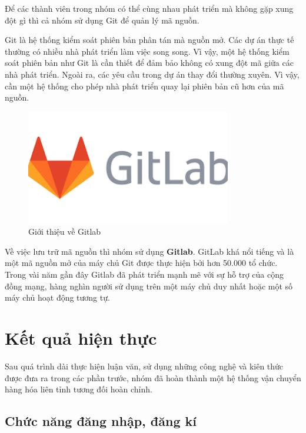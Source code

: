 	Để các thành viên trong nhóm có thể cùng nhau phát triển mà không gặp xung đột gì thì cả nhóm sử dụng Git để quản lý mã nguồn. 
	
	Git là hệ thống kiểm soát phiên bản phân tán mà nguồn mở. Các dự án thực tế thường có nhiều nhà phát triển làm việc song song. Vì vậy, một hệ thống kiểm soát phiên bản như Git là cần thiết để đảm bảo không có xung đột mã giữa các nhà phát triển. Ngoài ra, các yêu cầu trong dự án thay đổi thường xuyên. Vì vậy, cần một hệ thống cho phép nhà phát triển quay lại phiên bản cũ hơn của mã nguồn.
	
	\begin{figure}[!ht]
		\includegraphics[width=0.8\textwidth]{Images/gitlab.png}
		\centering
		\linebreak
		\caption{Giới thiệu về Gitlab}
	\end{figure}
	
	Về việc lưu trữ mã nguồn thì nhóm sử dụng \textbf{Gitlab}. GitLab khá nổi tiếng và là một mã nguồn mở của máy chủ Git được thực hiện bởi hơn 50.000 tổ chức. Trong vài năm gần đây Gitlab đã phát triển mạnh mẽ với sự hỗ trợ của cộng đồng mạng, hàng nghìn người sử dụng trên một máy chủ duy nhất hoặc một số máy chủ hoạt động tương tự.
	




\section{Kết quả hiện thực}

Sau quá trình dài thực hiện luận văn, sử dụng những công nghệ và kiên thức được đưa
ra trong các phần trước, nhóm đã hoàn thành một hệ thống vận chuyển hàng hóa liên tỉnh tương đối hoàn chỉnh.

\subsection{Chức năng đăng nhập, đăng kí}

